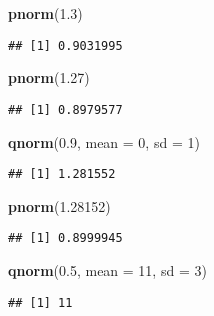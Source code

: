 \documentclass[]{article}
\newenvironment{Shaded}{\begin{snugshade}}{\end{snugshade}}
\newcommand{\DataTypeTok}[1]{\textcolor[rgb]{0.13,0.29,0.53}{#1}}
\newcommand{\DecValTok}[1]{\textcolor[rgb]{0.00,0.00,0.81}{#1}}
\newcommand{\FloatTok}[1]{\textcolor[rgb]{0.00,0.00,0.81}{#1}}
\newcommand{\KeywordTok}[1]{\textcolor[rgb]{0.13,0.29,0.53}{\textbf{#1}}}
\newcommand{\NormalTok}[1]{#1}
\begin{document}
\begin{Shaded}
\begin{Highlighting}[]
\KeywordTok{pnorm}\NormalTok{(}\FloatTok{1.3}\NormalTok{)}
\end{Highlighting}
\end{Shaded}

\begin{verbatim}
## [1] 0.9031995
\end{verbatim}

\begin{Shaded}
\begin{Highlighting}[]
\KeywordTok{pnorm}\NormalTok{(}\FloatTok{1.27}\NormalTok{)}
\end{Highlighting}
\end{Shaded}

\begin{verbatim}
## [1] 0.8979577
\end{verbatim}

\begin{Shaded}
\begin{Highlighting}[]
\KeywordTok{qnorm}\NormalTok{(}\FloatTok{0.9}\NormalTok{, }\DataTypeTok{mean =} \DecValTok{0}\NormalTok{, }\DataTypeTok{sd =} \DecValTok{1}\NormalTok{)}
\end{Highlighting}
\end{Shaded}

\begin{verbatim}
## [1] 1.281552
\end{verbatim}

\begin{Shaded}
\begin{Highlighting}[]
\KeywordTok{pnorm}\NormalTok{(}\FloatTok{1.28152}\NormalTok{)}
\end{Highlighting}
\end{Shaded}

\begin{verbatim}
## [1] 0.8999945
\end{verbatim}

\begin{Shaded}
\begin{Highlighting}[]
\KeywordTok{qnorm}\NormalTok{(}\FloatTok{0.5}\NormalTok{, }\DataTypeTok{mean =} \DecValTok{11}\NormalTok{, }\DataTypeTok{sd =} \DecValTok{3}\NormalTok{) }
\end{Highlighting}
\end{Shaded}

\begin{verbatim}
## [1] 11
\end{verbatim}
\end{document}
